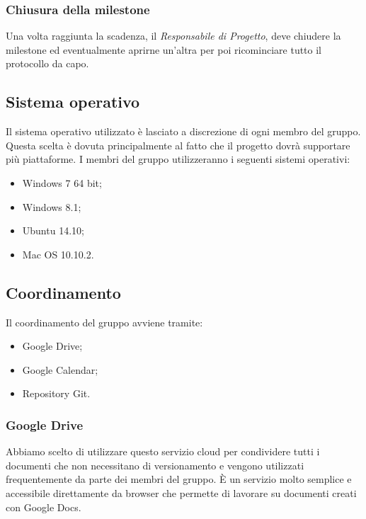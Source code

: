 \subsubsection{Chiusura della milestone}

Una volta raggiunta la scadenza, il \textit{Responsabile di Progetto}, deve chiudere la \gls{milestone} ed eventualmente aprirne un'altra per poi ricominciare tutto il protocollo da capo.




\subsection{Sistema operativo}

Il sistema operativo utilizzato è lasciato a discrezione di ogni membro del gruppo. Questa scelta è dovuta principalmente al fatto che il progetto dovrà supportare più piattaforme.
I membri del gruppo utilizzeranno i seguenti sistemi operativi:

\begin{itemize}
	\item \gls{Windows} 7 64 bit;
	\item \gls{Windows} 8.1;
	\item \gls{Ubuntu} 14.10;
	\item Mac OS 10.10.2.
\end{itemize}

\subsection{Coordinamento}

Il coordinamento del gruppo avviene tramite:
\begin{itemize}
	\item \gls{Google Drive};
	\item \gls{Google Calendar};	
	\item \gls{Repository} \gls{Git}.
\end{itemize}

\subsubsection{Google Drive}

Abbiamo scelto di utilizzare questo \gls{servizio cloud} per condividere tutti i documenti che non necessitano di \gls{versionamento} e vengono utilizzati frequentemente da parte dei membri del gruppo. 
È un servizio molto semplice e accessibile direttamente da \gls{browser} che permette di lavorare su documenti creati con \gls{Google Docs}.

